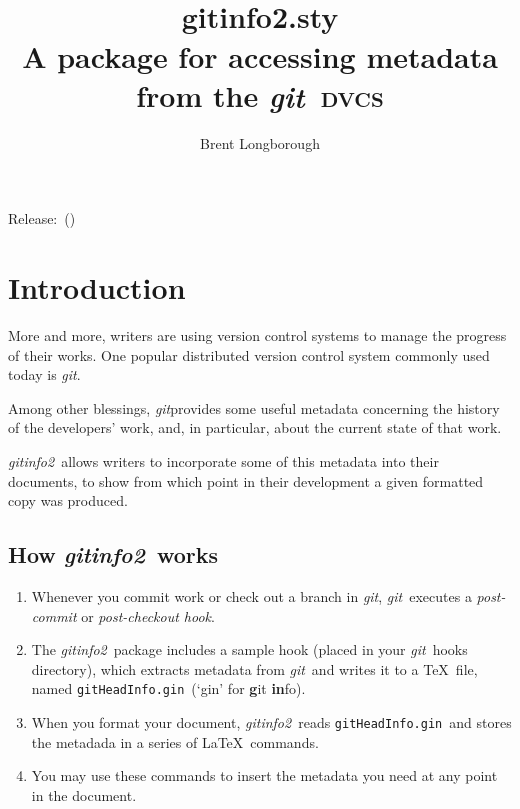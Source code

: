 \documentclass[a4paper,12pt,twoside,openany]{memoir}
\newcommand{\sfit}[1]{\textit{#1}}
\newcommand{\git}{\sfit{git}}
\newcommand{\tpname}{\sfit{gitinfo2}}
\newcommand{\tpfname}{\textsf{gitinfo2.sty}}
\newcommand{\ginname}{gitHeadInfo.gin}
\newcommand{\metaname}{\texttt{\ginname}}
\begin{document}
\frontmatter
\title{%
	~\\[2\baselineskip]
	\Huge \tpfname\\[2ex]%
	\Large A package for accessing metadata\\from the \git\ \textsc{dvcs}
	}
\author{Brent Longborough}
\date{}
\maketitle

{\centering
Release:\gitReln\ (\gitAbbrevHash)\\
}
\thispagestyle{empty}
\clearforchapter
\tableofcontents*
\mainmatter
\pagestyle{giruled}
\chapter{Introduction}
More and more, writers are using version control systems
to manage the progress of their works.
One popular distributed version control system commonly used today
is \git.

Among other blessings, \git provides
some useful metadata concerning the history of the developers'
work, and, in particular, about the current state of that work.

\tpname\ allows writers to incorporate some of this metadata
into their documents, to show from which point in their development
a given formatted copy was produced.

\section{How \tpname\ works}
\begin{enumerate}
\item Whenever you commit work or check out a branch in \git,
\git\ executes a \textit{post-commit} or \textit{post-checkout hook}.

\item The \tpname\ package includes a sample hook
(placed in your \git\ hooks directory),
which extracts metadata from \git\ and writes it to a \TeX\ file,
named \metaname\ (`gin' for \textbf{g}it \textbf{in}fo).

\item When you format your document, \tpname\ reads
\metaname\ and stores the metadada
in a series of \LaTeX\ commands.

\item You may use these commands to insert
the metadata you need at any point in the document.
\end{enumerate}
\end{document}

